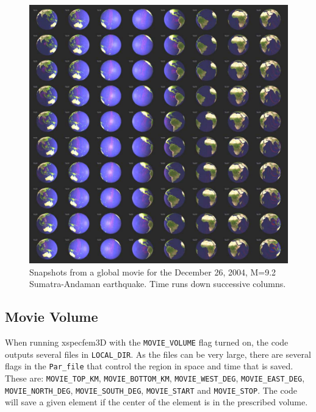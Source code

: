 \documentclass[oneside,english]{book}
\begin{document}
%
\begin{figure}[H]
\noindent \begin{centering}
\includegraphics[scale=0.75]{figures/geo-poster4_small}
\par\end{centering}

\caption{Snapshots from a global movie for the December 26, 2004, M=9.2 Sumatra-Andaman
earthquake. Time runs down successive columns.}

\end{figure}



\subsection{\label{sub:Movie-Volume}Movie Volume}

When running xspecfem3D with the \texttt{\small MOVIE\_VOLUME} flag
turned on, the code outputs several files in \texttt{\small LOCAL\_DIR}.
As the files can be very large, there are several flags in the \texttt{\small Par\_file}
that control the region in space and time that is saved. These are:
\texttt{\small MOVIE\_TOP\_KM}, \texttt{\small MOVIE\_BOTTOM\_KM},
\texttt{\small MOVIE\_WEST\_DEG}, \texttt{\small MOVIE\_EAST\_DEG},
\texttt{\small MOVIE\_NORTH\_DEG}, \texttt{\small MOVIE\_SOUTH\_DEG},
\texttt{\small MOVIE\_START} and \texttt{\small MOVIE\_STOP}. The
code will save a given element if the center of the element is in
the prescribed volume.
\end{document}
